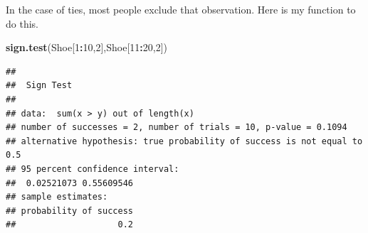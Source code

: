 \documentclass[]{book}
\newenvironment{Shaded}{\begin{snugshade}}{\end{snugshade}}
\newcommand{\KeywordTok}[1]{\textcolor[rgb]{0.13,0.29,0.53}{\textbf{#1}}}
\newcommand{\DataTypeTok}[1]{\textcolor[rgb]{0.13,0.29,0.53}{#1}}
\newcommand{\DecValTok}[1]{\textcolor[rgb]{0.00,0.00,0.81}{#1}}
\newcommand{\FloatTok}[1]{\textcolor[rgb]{0.00,0.00,0.81}{#1}}
\newcommand{\StringTok}[1]{\textcolor[rgb]{0.31,0.60,0.02}{#1}}
\newcommand{\OtherTok}[1]{\textcolor[rgb]{0.56,0.35,0.01}{#1}}
\newcommand{\ControlFlowTok}[1]{\textcolor[rgb]{0.13,0.29,0.53}{\textbf{#1}}}
\newcommand{\OperatorTok}[1]{\textcolor[rgb]{0.81,0.36,0.00}{\textbf{#1}}}
\newcommand{\NormalTok}[1]{#1}
\theoremstyle{definition}
\theoremstyle{definition}
\theoremstyle{definition}
\theoremstyle{remark}
\begin{document}
In the case of ties, most people exclude that observation. Here is my
function to do this.

\begin{Shaded}
\end{Shaded}

\begin{Shaded}
\begin{Highlighting}[]
\KeywordTok{sign.test}\NormalTok{(Shoe[}\DecValTok{1}\OperatorTok{:}\DecValTok{10}\NormalTok{,}\DecValTok{2}\NormalTok{],Shoe[}\DecValTok{11}\OperatorTok{:}\DecValTok{20}\NormalTok{,}\DecValTok{2}\NormalTok{])}
\end{Highlighting}
\end{Shaded}

\begin{verbatim}
## 
##  Sign Test
## 
## data:  sum(x > y) out of length(x)
## number of successes = 2, number of trials = 10, p-value = 0.1094
## alternative hypothesis: true probability of success is not equal to 0.5
## 95 percent confidence interval:
##  0.02521073 0.55609546
## sample estimates:
## probability of success 
##                    0.2
\end{verbatim}
\end{document}
